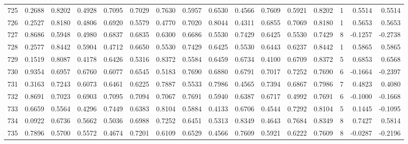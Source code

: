 \begin{tabular}{lrrrrrrrrrrrrrrr}
725 &      0.2688 &  0.8202 &  0.4928 &  0.7095 &  0.7029 &  0.7630 &  0.5957 &  0.6530 &  0.4566 &  0.7609 &   0.5921 &     0.8202 &      1 &                    0.5514 &                     0.5514 \\
726 &      0.2527 &  0.8180 &  0.4806 &  0.6920 &  0.5579 &  0.4770 &  0.7020 &  0.8044 &  0.4311 &  0.6855 &   0.7069 &     0.8180 &      1 &                    0.5653 &                     0.5653 \\
727 &      0.8686 &  0.5948 &  0.4980 &  0.6837 &  0.6835 &  0.6300 &  0.6686 &  0.5530 &  0.7429 &  0.6425 &   0.5530 &     0.7429 &      8 &                   -0.1257 &                    -0.2738 \\
728 &      0.2577 &  0.8442 &  0.5904 &  0.4712 &  0.6650 &  0.5530 &  0.7429 &  0.6425 &  0.5530 &  0.6443 &   0.6237 &     0.8442 &      1 &                    0.5865 &                     0.5865 \\
729 &      0.1519 &  0.8087 &  0.4178 &  0.6426 &  0.5316 &  0.8372 &  0.5584 &  0.6459 &  0.6734 &  0.4100 &   0.6709 &     0.8372 &      5 &                    0.6853 &                     0.6568 \\
730 &      0.9354 &  0.6957 &  0.6760 &  0.6077 &  0.6545 &  0.5183 &  0.7690 &  0.6880 &  0.6791 &  0.7017 &   0.7252 &     0.7690 &      6 &                   -0.1664 &                    -0.2397 \\
731 &      0.3163 &  0.7243 &  0.6073 &  0.6461 &  0.6225 &  0.7887 &  0.5533 &  0.7986 &  0.4565 &  0.7394 &   0.6867 &     0.7986 &      7 &                    0.4823 &                     0.4080 \\
732 &      0.8691 &  0.7023 &  0.6903 &  0.7095 &  0.7094 &  0.7067 &  0.7691 &  0.5940 &  0.6387 &  0.6717 &   0.4992 &     0.7691 &      6 &                   -0.1000 &                    -0.1668 \\
733 &      0.6659 &  0.5564 &  0.4296 &  0.7449 &  0.6383 &  0.8104 &  0.5884 &  0.4133 &  0.6706 &  0.4544 &   0.7292 &     0.8104 &      5 &                    0.1445 &                    -0.1095 \\
734 &      0.0922 &  0.6736 &  0.5662 &  0.5036 &  0.6988 &  0.7252 &  0.6451 &  0.5313 &  0.8349 &  0.4643 &   0.7684 &     0.8349 &      8 &                    0.7427 &                     0.5814 \\
735 &      0.7896 &  0.5700 &  0.5572 &  0.4674 &  0.7201 &  0.6109 &  0.6529 &  0.4566 &  0.7609 &  0.5921 &   0.6222 &     0.7609 &      8 &                   -0.0287 &                    -0.2196 \\

\end{tabular}
